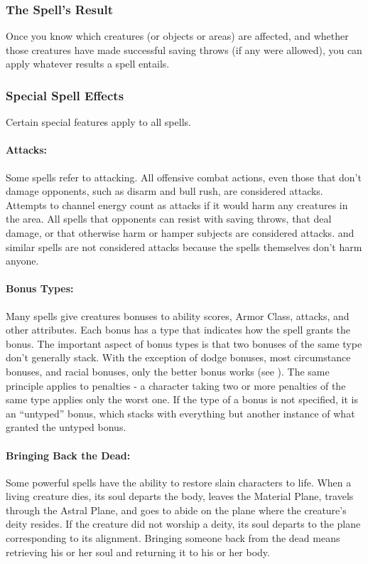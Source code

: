 \documentclass[../VancianToPsionics.tex]{subfiles}
\begin{document}
\subsubsection{The Spell's Result}
Once you know which creatures (or objects or areas) are affected, and whether those creatures have made successful saving throws (if any were allowed), you can apply whatever results a spell entails.

\subsubsection{Special Spell Effects}
Certain special features apply to all spells.

\paragraph{Attacks:} Some spells refer to attacking. All offensive combat actions, even those that don't damage opponents, such as disarm and bull rush, are considered attacks. Attempts to channel energy count as attacks if it would harm any creatures in the area. All spells that opponents can resist with saving throws, that deal damage, or that otherwise harm or hamper subjects are considered attacks.  and similar spells are not considered attacks because the spells themselves don't harm anyone.

\paragraph{Bonus Types:} Many spells give creatures bonuses to ability scores, Armor Class, attacks, and other attributes. Each bonus has a type that indicates how the spell grants the bonus. The important aspect of bonus types is that two bonuses of the same type don't generally stack. With the exception of dodge bonuses, most circumstance bonuses, and racial bonuses, only the better bonus works (see ). The same principle applies to penalties - a character taking two or more penalties of the same type applies only the worst one. If the type of a bonus is not specified, it is an ``untyped'' bonus, which stacks with everything but another instance of what granted the untyped bonus.

\paragraph{Bringing Back the Dead:} Some powerful spells have the ability to restore slain characters to life. When a living creature dies, its soul departs the body, leaves the Material Plane, travels through the Astral Plane, and goes to abide on the plane where the creature's deity resides. If the creature did not worship a deity, its soul departs to the plane corresponding to its alignment. Bringing someone back from the dead means retrieving his or her soul and returning it to his or her body.
\end{document}
